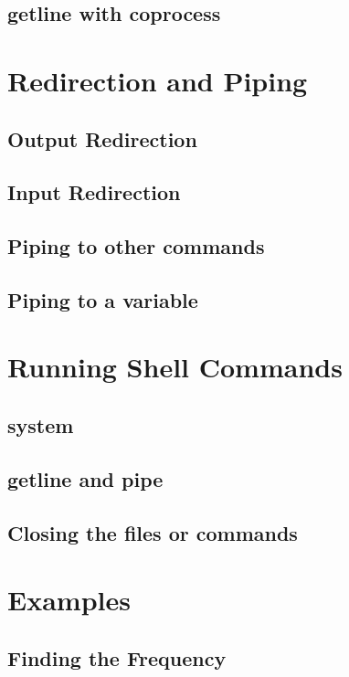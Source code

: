 \subsection{getline with coprocess}

\section{Redirection and Piping}

\subsection{Output Redirection}

\subsection{Input Redirection}

\subsection{Piping to other commands}

\subsection{Piping to a variable}

\section{Running Shell Commands}

\subsection{system}

\subsection{getline and pipe}

\subsection{Closing the files or commands}

\section{Examples}

\subsection{Finding the Frequency}

